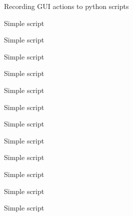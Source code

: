 \begin{frame}{Recording GUI actions to python scripts}
\end{frame}

\begin{frame}{Simple script}
\end{frame}
\begin{frame}{Simple script}
\end{frame}
\begin{frame}{Simple script}
\end{frame}
\begin{frame}{Simple script}
\end{frame}
\begin{frame}{Simple script}
\end{frame}
\begin{frame}{Simple script}
\end{frame}
\begin{frame}{Simple script}
\end{frame}
\begin{frame}{Simple script}
\end{frame}
\begin{frame}{Simple script}
\end{frame}
\begin{frame}{Simple script}
\end{frame}
\begin{frame}{Simple script}
\end{frame}
\begin{frame}{Simple script}
\end{frame}
